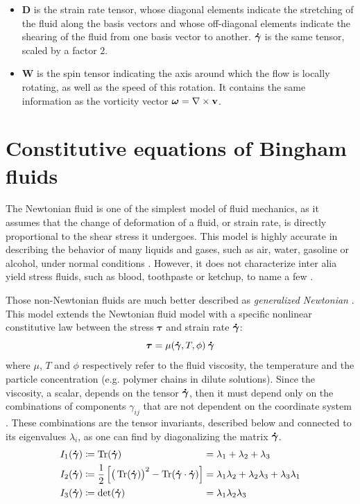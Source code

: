 \documentclass[11 pt]{report}
\begin{document}
\begin{itemize}[label=---]
    \item $\mathbf{D}$ is the strain rate tensor, whose diagonal elements indicate the stretching of the fluid along the basis vectors and whose off-diagonal elements indicate the shearing of the fluid from one basis vector to another. $\boldsymbol{\dot \gamma}$ is the same tensor, scaled by a factor $2$.
    \item $\mathbf{W}$ is the spin tensor indicating the axis around which the flow is locally rotating, as well as the speed of this rotation. It contains the same information as the vorticity vector $\boldsymbol\omega = \nabla \times \mathbf{v}$.
\end{itemize} 

\section{Constitutive equations of Bingham fluids}

The Newtonian fluid is one of the simplest model of fluid mechanics, as it assumes that the change of deformation of a fluid, or strain rate, is directly proportional to the shear stress it undergoes. This model is highly accurate in describing the behavior of many liquids and gases, such as air, water, gasoline or alcohol, under normal conditions \cite{fox2020fox}. However, it does not characterize inter alia yield stress fluids, such as blood, toothpaste or ketchup, to name a few \cite{Coussot,Geophysical}.

Those non-Newtonian fluids are much better described as \textit{generalized Newtonian} \cite{Geophysical}. This model extends the Newtonian fluid model with a specific nonlinear constitutive law between the stress $\boldsymbol\tau$ and strain rate $\boldsymbol{\dot \gamma}$:
\begin{equation}
    \boldsymbol\tau = \mu(\boldsymbol{\dot \gamma}, T, \phi) \: \boldsymbol{\dot \gamma}
    \label{eq:power-law}
\end{equation}
where $\mu$, $T$ and $\phi$ respectively refer to the fluid viscosity, the temperature and the particle concentration (e.g. polymer chains in dilute solutions). Since the viscosity, a scalar, depends on the tensor $\boldsymbol{\dot \gamma}$, then it must depend only on the combinations of components $\gamma_{ij}$ that are not dependent on the coordinate system \cite{bird1987dynamics}. These combinations are the tensor invariants, described below and connected to its eigenvalues $\lambda_i$, as one can find by diagonalizing the matrix $\boldsymbol{\dot \gamma}$.
\begin{equation}
    \begin{alignedat}{2}
        I_1(\boldsymbol{\dot \gamma}) &\coloneqq \Tr(\boldsymbol{\dot \gamma}) &&= \lambda_1 + \lambda_2 + \lambda_3\\
        I_2(\boldsymbol{\dot \gamma}) &\coloneqq \frac{1}{2} \left[\big(\Tr(\boldsymbol{\dot \gamma})\big)^2 - \Tr(\boldsymbol{\dot \gamma} \cdot \boldsymbol{\dot \gamma})\right] &&= \lambda_1\lambda_2 + \lambda_2\lambda_3 + \lambda_3\lambda_1\\
        I_3(\boldsymbol{\dot \gamma}) &\coloneqq \det(\boldsymbol{\dot \gamma}) &&= \lambda_1\lambda_2\lambda_3
    \end{alignedat}
\end{equation}
\end{document}
